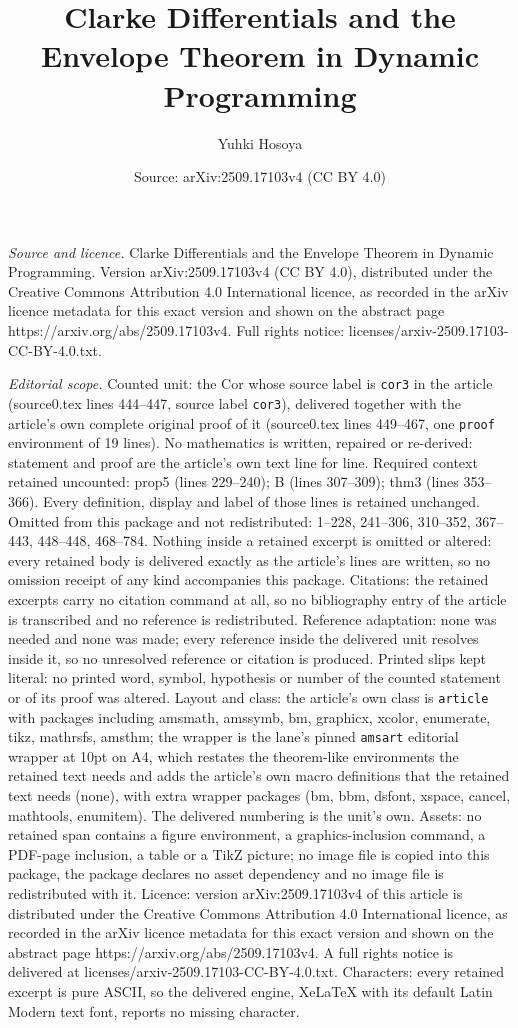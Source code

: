 \documentclass[10pt,a4paper]{amsart}
\title[Clarke Differentials and the Envelope Theorem in Dynamic Pro]{Clarke Differentials and the Envelope Theorem in Dynamic Programming}
\author{Yuhki Hosoya}
\date{Source: arXiv:2509.17103v4 (CC BY 4.0)}
\begin{document}
\maketitle

\noindent\emph{Source and licence.} Clarke Differentials and the Envelope Theorem in Dynamic Programming. Version arXiv:2509.17103v4 (CC BY 4.0), distributed under the Creative Commons Attribution 4.0 International licence, as recorded in the arXiv licence metadata for this exact version and shown on the abstract page https://arxiv.org/abs/2509.17103v4. Full rights notice: licenses/arxiv-2509.17103-CC-BY-4.0.txt.\par\smallskip

\noindent\textit{Editorial scope.} Counted unit: the Cor whose source label is \texttt{cor3} in the article (source0.tex lines 444--447, source label \texttt{cor3}), delivered together with the article's own complete original proof of it (source0.tex lines 449--467, one \texttt{proof} environment of 19 lines). No mathematics is written, repaired or re-derived: statement and proof are the article's own text line for line. Required context retained uncounted: prop5 (lines 229--240); B (lines 307--309); thm3 (lines 353--366). Every definition, display and label of those lines is retained unchanged. Omitted from this package and not redistributed: 1--228, 241--306, 310--352, 367--443, 448--448, 468--784. Nothing inside a retained excerpt is omitted or altered: every retained body is delivered exactly as the article's lines are written, so no omission receipt of any kind accompanies this package. Citations: the retained excerpts carry no citation command at all, so no bibliography entry of the article is transcribed and no reference is redistributed. Reference adaptation: none was needed and none was made; every reference inside the delivered unit resolves inside it, so no unresolved reference or citation is produced. Printed slips kept literal: no printed word, symbol, hypothesis or number of the counted statement or of its proof was altered. Layout and class: the article's own class is \texttt{article} with packages including amsmath, amssymb, bm, graphicx, xcolor, enumerate, tikz, mathrsfs, amsthm; the wrapper is the lane's pinned \texttt{amsart} editorial wrapper at 10pt on A4, which restates the theorem-like environments the retained text needs and adds the article's own macro definitions that the retained text needs (none), with extra wrapper packages (bm, bbm, dsfont, xspace, cancel, mathtools, enumitem). The delivered numbering is the unit's own. Assets: no retained span contains a figure environment, a graphics-inclusion command, a PDF-page inclusion, a table or a TikZ picture; no image file is copied into this package, the package declares no asset dependency and no image file is redistributed with it. Licence: version arXiv:2509.17103v4 of this article is distributed under the Creative Commons Attribution 4.0 International licence, as recorded in the arXiv licence metadata for this exact version and shown on the abstract page https://arxiv.org/abs/2509.17103v4. A full rights notice is delivered at licenses/arxiv-2509.17103-CC-BY-4.0.txt. Characters: every retained excerpt is pure ASCII, so the delivered engine, XeLaTeX with its default Latin Modern text font, reports no missing character.
\end{document}
